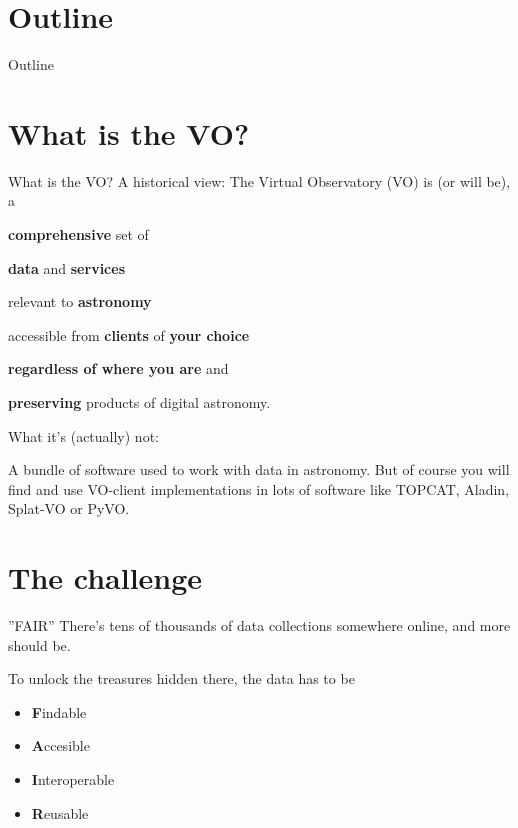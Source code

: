 \documentclass{beamer}
\title{}
\author{Dave Morris, Hendrik Heinl}
\institute{University of Edinburgh, CDS/CNRS}
\begin{document}
\begin{frame}
\titlepage
\end{frame}

\section*{Outline}
\begin{frame}{Outline}
\tableofcontents
\end{frame}

\section{What is the VO?}
\begin{frame}{What is the VO?}
A historical view: The Virtual Observatory (VO) is (or will be), a
\newline
\newline
\centerline{\textbf{comprehensive} set of}
\centerline{\textbf{data} and \textbf{services}}
\centerline{relevant to \textbf{astronomy}}
\centerline{accessible from \textbf{clients} of \textbf{your choice}}
\centerline{\textbf{regardless of where you are} and}
\centerline{\textbf{preserving} products of digital astronomy.}
\end{frame}

\begin{frame}{What it's (actually) not:}

A bundle of software used to work with data in astronomy. 
\newline
\newline
But of course you will find and use VO-client implementations in lots of
software like TOPCAT, Aladin, Splat-VO or PyVO. 

\end{frame}


\section{The challenge}

\begin{frame}{''FAIR''}
There's tens of thousands of data collections somewhere online,
and more should be.

To unlock the treasures hidden there, the data has to be
\begin{itemize}
\item \textbf{F}indable
\item \textbf{A}ccesible
\item \textbf{I}nteroperable
\item \textbf{R}eusable
\end{itemize}
\end{frame}
\end{document}
